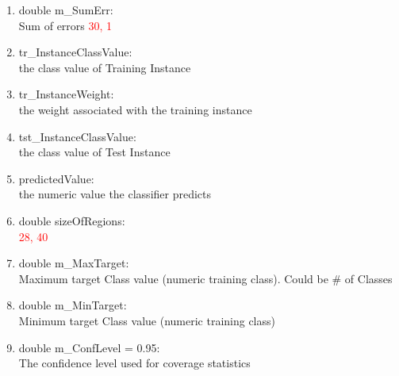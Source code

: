 \documentclass[a4paper,12pt]{article}
\begin{document}
\begin{enumerate}
  \item double m\_SumErr: \\  Sum of errors \textcolor{red}{30, 1} 
  
  
  \item tr\_InstanceClassValue: \\ the class value of Training Instance 
  
  \item tr\_InstanceWeight: \\  the weight associated with the training instance
  
 \item tst\_InstanceClassValue: \\  the class value of Test Instance
  
  \item predictedValue: \\ the numeric value the classifier predicts
  
  
  \item double sizeOfRegions: \\  \textcolor{red}{28, 40} 
  

  \item double m\_MaxTarget: \\ Maximum target Class value (numeric training class). Could be \# of Classes
  
 
  \item double m\_MinTarget: \\ Minimum target Class value  (numeric training class)
  
  
  
  \item double m\_ConfLevel = 0.95: \\ The confidence level used for coverage statistics
  
  
  
  
  

  

  


\end{enumerate}
\newpage
\end{document}
